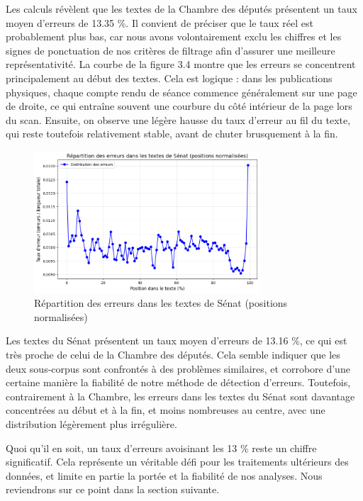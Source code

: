\documentclass[a4paper,twoside,12pt]{book}
\begin{document}
Les calculs révèlent que les textes de la Chambre des députés présentent un taux moyen d'erreurs de 13.35 \%. Il convient de préciser que le taux réel est probablement plus bas, car nous avons volontairement exclu les chiffres et les signes de ponctuation de nos critères de filtrage afin d'assurer une meilleure représentativité. La courbe de la figure 3.4 montre que les erreurs se concentrent principalement au début des textes. Cela est logique : dans les publications physiques, chaque compte rendu de séance commence généralement sur une page de droite, ce qui entraîne souvent une courbure du côté intérieur de la page lors du scan. Ensuite, on observe une légère hausse du taux d'erreur au fil du texte, qui reste toutefois relativement stable, avant de chuter brusquement à la fin.


\begin{figure}
\centering %
\includegraphics[width=0.75\textwidth]{img/es.png}
\caption{Répartition des erreurs dans les textes de Sénat (positions normalisées)}
\end{figure}

Les textes du Sénat présentent un taux moyen d'erreurs de 13.16 \%, ce qui est très proche de celui de la Chambre des députés. Cela semble indiquer que les deux sous-corpus sont confrontés à des problèmes similaires, et corrobore d'une certaine manière la fiabilité de notre méthode de détection d'erreurs. Toutefois, contrairement à la Chambre, les erreurs dans les textes du Sénat sont davantage concentrées au début et à la fin, et moins nombreuses au centre, avec une distribution légèrement plus irrégulière.

Quoi qu'il en soit, un taux d'erreurs avoisinant les 13 \% reste un chiffre significatif. Cela représente un véritable défi pour les traitements ultérieurs des données, et limite en partie la portée et la fiabilité de nos analyses. Nous reviendrons sur ce point dans la section suivante.
\end{document}
